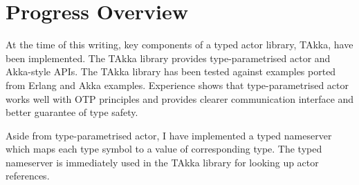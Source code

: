 \section{Progress Overview}
At the time of this writing, key components of a typed actor library, TAkka, have been implemented.  The TAkka library provides type-parametrised actor and Akka-style APIs.  The TAkka library has been tested against examples ported from Erlang and Akka examples.  Experience shows that type-parametrised actor works well with OTP principles and provides clearer communication interface and better guarantee of type safety.

Aside from type-parametrised actor, I have implemented a typed nameserver which maps each type symbol to a value of corresponding type.  The typed nameserver is immediately used in the TAkka library for looking up actor references.







